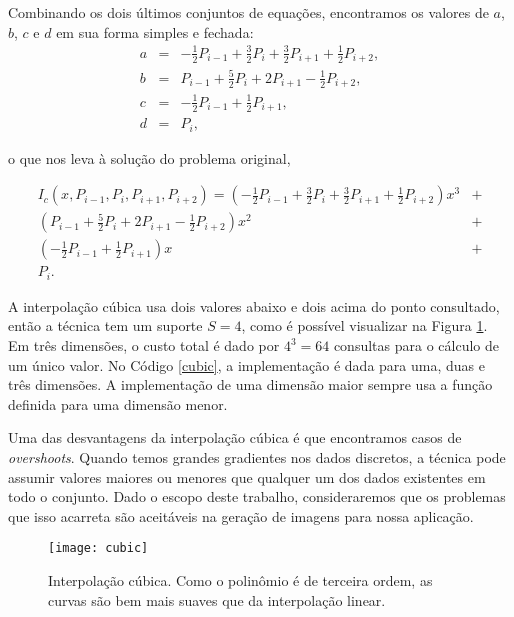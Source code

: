 Combinando os dois últimos conjuntos de equações, encontramos os valores de $a$, $b$, $c$ e $d$ em sua forma simples e fechada:
\[
\begin{array}{rcl}
a & = & -\frac{1}{2}P_{i-1} +\frac{3}{2}P_{i} +\frac{3}{2}P_{i+1} +\frac{1}{2}P_{i+2}, \\
b & = & P_{i-1} +\frac{5}{2}P_{i} + 2P_{i+1} -\frac{1}{2}P_{i+2}, \\
c & = & -\frac{1}{2}P_{i-1} + \frac{1}{2}P_{i+1}, \\
d & = & P_{i},
\end{array} 
\]

o que nos leva à solução do problema original,


\begin{align*}
 I_{c} (x, P_{i-1}, P_{i}, P_{i+1}, P_{i+2}) = \left( -\frac{1}{2}P_{i-1} +\frac{3}{2}P_{i} +\frac{3}{2}P_{i+1} +\frac{1}{2}P_{i+2} \right)x^3 &+ \\
 \left( P_{i-1} +\frac{5}{2}P_{i} + 2P_{i+1} -\frac{1}{2}P_{i+2} \right)x^2 &+ \\ \left( -\frac{1}{2}P_{i-1} + \frac{1}{2}P_{i+1} \right)x &+ \\ P_{i}.
 \end{align*}

A interpolação cúbica usa dois valores abaixo e dois acima do ponto consultado, então a técnica tem um suporte $S = 4$, como é possível visualizar na Figura \ref{cubicInterp}. Em três dimensões, o custo total é dado por $4^3 = 64$ consultas para o cálculo de um único valor. No Código \ref{cubic}, a implementação é dada para uma, duas e três dimensões. A implementação de uma dimensão maior sempre usa a função definida para uma dimensão menor.

Uma das desvantagens da interpolação cúbica é que encontramos casos de {\it overshoots}. Quando temos grandes gradientes nos dados discretos, a técnica pode assumir valores maiores ou menores que qualquer um dos dados existentes em todo o conjunto. Dado o escopo deste trabalho, consideraremos que os problemas que isso acarreta são aceitáveis na geração de imagens para nossa aplicação.

\begin{figure}[!htb]
\center
\texttt{[image: cubic]}
\caption{Interpolação cúbica. Como o polinômio é de terceira ordem, as curvas são bem mais suaves que da interpolação linear.}
\label{cubicInterp}
\end{figure}

\begin{figure}[!htb]

\end{figure}

